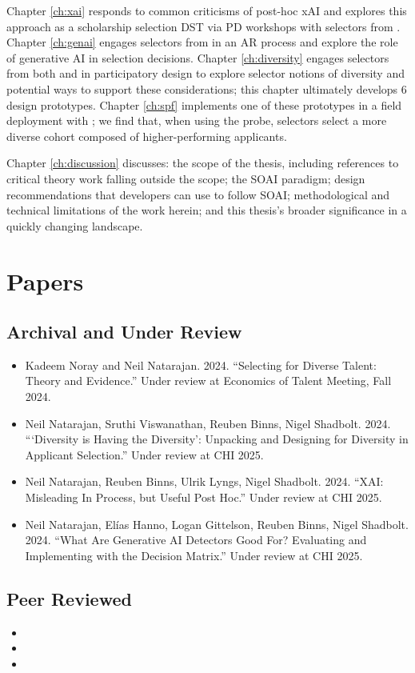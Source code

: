 Chapter \ref{ch:xai} responds to common criticisms of post-hoc xAI and explores this approach as a scholarship selection DST via PD workshops with selectors from \rise. Chapter \ref{ch:genai} engages selectors from \rise in an AR process and explore the role of generative AI in selection decisions. Chapter \ref{ch:diversity} engages selectors from both \rise and \eit in participatory design to explore selector notions of diversity and potential ways to support these considerations; this chapter ultimately develops 6 design prototypes. Chapter \ref{ch:spf} implements one of these prototypes in a field deployment with \rise; we find that, when using the probe, selectors select a more diverse cohort composed of higher-performing applicants. 

Chapter \ref{ch:discussion} discusses: the scope of the thesis, including references to critical theory work falling outside the scope; the SOAI paradigm; design recommendations that developers can use to follow SOAI; methodological and technical limitations of the work herein; and this thesis's broader significance in a quickly changing landscape. 

\section{Papers}
\subsection{Archival and Under Review}
\begin{itemize}
    \item Kadeem Noray and Neil Natarajan. 2024. “Selecting for Diverse Talent: Theory and Evidence.” Under review at Economics of Talent Meeting, Fall 2024.
    \item Neil Natarajan, Sruthi Viswanathan, Reuben Binns, Nigel Shadbolt. 2024. “‘Diversity is Having the Diversity’: Unpacking and Designing for Diversity in Applicant Selection.” Under review at CHI 2025.
    \item Neil Natarajan, Reuben Binns, Ulrik Lyngs, Nigel Shadbolt. 2024. “XAI: Misleading In Process, but Useful Post Hoc.” Under review at CHI 2025.
    \item Neil Natarajan, Elías Hanno, Logan Gittelson, Reuben Binns, Nigel Shadbolt. 2024. “What Are Generative AI Detectors Good For? Evaluating and Implementing with the Decision Matrix.” Under review at CHI 2025.
\end{itemize}

\subsection{Peer Reviewed}
\begin{itemize}
    \item {}
    \item {} 
    \item {}
\end{itemize}



